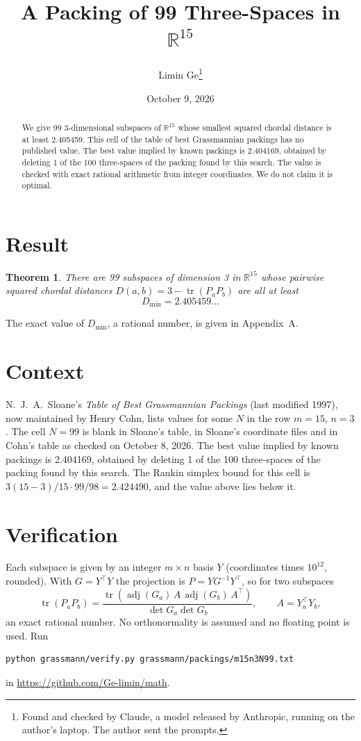 \documentclass[11pt,a4paper]{article}
\title{A Packing of 99 Three-Spaces in $\mathbb{R}^{15}$}
\author{Limin Ge\thanks{Found and checked by Claude, a model released by Anthropic, running on the author's laptop. The author sent the prompts.}}
\date{October 9, 2026}
\newtheorem*{theorem}{Theorem}
\begin{document}
\maketitle
\begin{abstract}
We give 99 3-dimensional subspaces of $\mathbb{R}^{15}$ whose smallest squared chordal distance is at least 2.405459. This cell of the table of best Grassmannian packings has no published value. The best value implied by known packings is 2.404169, obtained by deleting 1 of the 100 three-spaces of the packing found by this search. The value is checked with exact rational arithmetic from integer coordinates. We do not claim it is optimal.
\end{abstract}

\section{Result}
\begin{theorem}
There are 99 subspaces of dimension 3 in $\mathbb{R}^{15}$ whose pairwise squared chordal distances $D(a,b) = 3 - \operatorname{tr}(P_aP_b)$ are all at least
\[ D_{\min} = 2.405459\ldots \]
\end{theorem}
The exact value of $D_{\min}$, a rational number, is given in Appendix~A.


\section{Context}
N.~J.~A.~Sloane's \emph{Table of Best Grassmannian Packings} (last modified 1997), now maintained by Henry Cohn, lists values for some $N$ in the row $m=15$, $n=3$. The cell $N=99$ is blank in Sloane's table, in Sloane's coordinate files and in Cohn's table as checked on October 8, 2026. The best value implied by known packings is 2.404169, obtained by deleting 1 of the 100 three-spaces of the packing found by this search. The Rankin simplex bound for this cell is $3(15-3)/15\cdot 99/98 = 2.424490$, and the value above lies below it.


\section{Verification}
Each subspace is given by an integer $m\times n$ basis $Y$ (coordinates times $10^{12}$, rounded). With $G=Y^\top Y$ the projection is $P=YG^{-1}Y^\top$, so for two subspaces
\[ \operatorname{tr}(P_aP_b)=\frac{\operatorname{tr}(\operatorname{adj}(G_a)\,A\,\operatorname{adj}(G_b)\,A^\top)}{\det G_a\det G_b},\qquad A=Y_a^\top Y_b, \]
an exact rational number. No orthonormality is assumed and no floating point is used. Run
\begin{verbatim}
python grassmann/verify.py grassmann/packings/m15n3N99.txt
\end{verbatim}
in \url{https://github.com/Ge-limin/math}.
\end{document}
